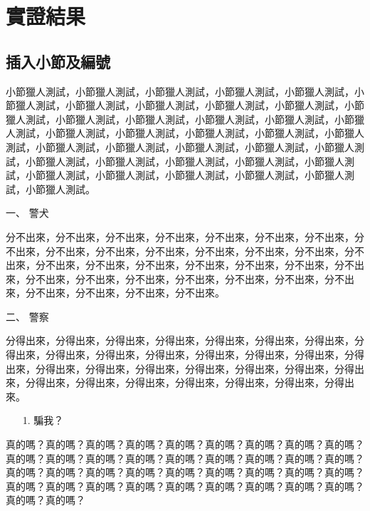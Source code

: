 \chapter{實證結果}
\label{c:implement}

\section{插入小節及編號}

小節獵人測試，小節獵人測試，小節獵人測試，小節獵人測試，小節獵人測試，小節獵人測試，小節獵人測試，小節獵人測試，小節獵人測試，小節獵人測試，小節獵人測試，小節獵人測試，小節獵人測試，小節獵人測試，小節獵人測試，小節獵人測試，小節獵人測試，小節獵人測試，小節獵人測試，小節獵人測試，小節獵人測試，小節獵人測試，小節獵人測試，小節獵人測試，小節獵人測試，小節獵人測試，小節獵人測試，小節獵人測試，小節獵人測試，小節獵人測試，小節獵人測試，小節獵人測試，小節獵人測試，小節獵人測試，小節獵人測試，小節獵人測試，小節獵人測試。




\begin{itemize}
\begin{large}
\item[一、]
警犬  
\end{large}
\end{itemize}
分不出來，分不出來，分不出來，分不出來，分不出來，分不出來，分不出來，分不出來，分不出來，分不出來，分不出來，分不出來，分不出來，分不出來，分不出來，分不出來，分不出來，分不出來，分不出來，分不出來，分不出來，分不出來，分不出來，分不出來，分不出來，分不出來，分不出來，分不出來，分不出來，分不出來，分不出來，分不出來，分不出來。

\begin{itemize}
\begin{large}
\item[二、]
警察
\end{large}
\end{itemize}


分得出來，分得出來，分得出來，分得出來，分得出來，分得出來，分得出來，分得出來，分得出來，分得出來，分得出來，分得出來，分得出來，分得出來，分得出來，分得出來，分得出來，分得出來，分得出來，分得出來，分得出來，分得出來，分得出來，分得出來，分得出來，分得出來，分得出來，分得出來，分得出來。

\begin{itemize}
\item[1.]
騙我？
\end{itemize}

真的嗎？真的嗎？真的嗎？真的嗎？真的嗎？真的嗎？真的嗎？真的嗎？真的嗎？真的嗎？真的嗎？真的嗎？真的嗎？真的嗎？真的嗎？真的嗎？真的嗎？真的嗎？真的嗎？真的嗎？真的嗎？真的嗎？真的嗎？真的嗎？真的嗎？真的嗎？真的嗎？真的嗎？真的嗎？真的嗎？真的嗎？真的嗎？真的嗎？真的嗎？真的嗎？真的嗎？真的嗎？真的嗎？



